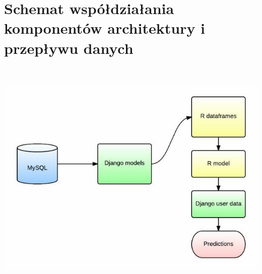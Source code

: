 \documentclass[licencjacka]{pracamgr}
\begin{document}
\section{Schemat współdziałania komponentów architektury i przepływu danych}
~\\
\begin{minipage}{\linewidth} 
	\centering
           \includegraphics[scale = 0.7]{dataFlow.jpg}
\end{minipage} \\ \\ 
~\\ \indent
\end{document}

